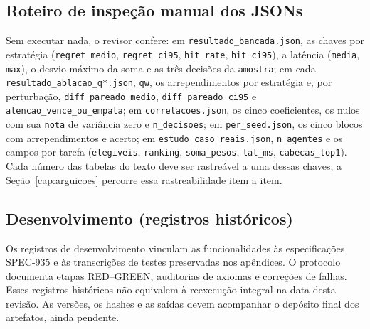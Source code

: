 \subsection{Roteiro de inspeção manual dos JSONs}
Sem executar nada, o revisor confere: em \nolinkurl{resultado_bancada.json}, as chaves por estratégia (\texttt{regret\_medio}, \texttt{regret\_ci95}, \texttt{hit\_rate}, \texttt{hit\_ci95}), a latência (\texttt{media}, \texttt{max}), o desvio máximo da soma e as três decisões da \texttt{amostra}; em cada \nolinkurl{resultado_ablacao_q*.json}, \texttt{qw}, os arrependimentos por estratégia e, por perturbação, \texttt{diff\_pareado\_medio}, \texttt{diff\_pareado\_ci95} e \texttt{atencao\_vence\_ou\_empata}; em \nolinkurl{correlacoes.json}, os cinco coeficientes, os nulos com sua \texttt{nota} de variância zero e \texttt{n\_decisoes}; em \nolinkurl{per_seed.json}, os cinco blocos com arrependimentos e acerto; em \nolinkurl{estudo_caso_reais.json}, \texttt{n\_agentes} e os campos por tarefa (\texttt{elegiveis}, \texttt{ranking}, \texttt{soma\_pesos}, \texttt{lat\_ms}, \texttt{cabecas\_top1}). Cada número das tabelas do texto deve ser rastreável a uma dessas chaves; a Seção~\ref{cap:arguicoes} percorre essa rastreabilidade item a item.
\subsection{Desenvolvimento (registros históricos)}
Os registros de desenvolvimento vinculam as funcionalidades às especificações SPEC-935 e às transcrições de testes preservadas nos apêndices. O protocolo documenta etapas RED--GREEN, auditorias de axiomas e correções de falhas. Esses registros históricos não equivalem à reexecução integral na data desta revisão. As versões, os hashes e as saídas devem acompanhar o depósito final dos artefatos, ainda pendente.
